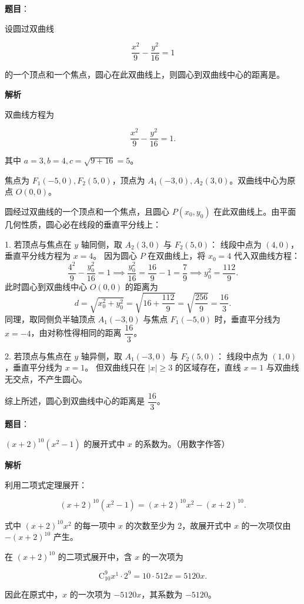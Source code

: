 \begin{answer}

\textbf{题目}：

设圆过双曲线

\nopagebreak[4]
\[
\frac{x^2}{9}-\frac{y^2}{16}=1
\]

的一个顶点和一个焦点，圆心在此双曲线上，则圆心到双曲线中心的距离是\gkblank{}。

\textbf{解析}

双曲线方程为

\nopagebreak[4]
\[
\frac{x^2}{9} - \frac{y^2}{16} = 1.
\]

其中 $a=3, b=4, c=\sqrt{9+16}=5$。

焦点为 $F_1(-5,0), F_2(5,0)$，顶点为 $A_1(-3,0), A_2(3,0)$。双曲线中心为原点 $O(0,0)$。

圆经过双曲线的一个顶点和一个焦点，且圆心 $P(x_0, y_0)$ 在此双曲线上。由平面几何性质，圆心必在线段的垂直平分线上：

1. 若顶点与焦点在 $y$ 轴同侧，取 $A_2(3,0)$ 与 $F_2(5,0)$：
   线段中点为 $(4,0)$，垂直平分线方程为 $x=4$。
   因为圆心 $P$ 在双曲线上，将 $x_0=4$ 代入双曲线方程：
\nopagebreak[4]
\[
\frac{4^2}{9} - \frac{y_0^2}{16} = 1 \implies \frac{y_0^2}{16} = \frac{16}{9} - 1 = \frac79 \implies y_0^2 = \frac{112}{9}.
\]
   此时圆心到双曲线中心 $O(0,0)$ 的距离为
\nopagebreak[4]
\[
d = \sqrt{x_0^2 + y_0^2} = \sqrt{16 + \frac{112}{9}} = \sqrt{\frac{256}{9}} = \frac{16}{3}.
\]
   同理，取同侧负半轴顶点 $A_1(-3,0)$ 与焦点 $F_1(-5,0)$ 时，垂直平分线为 $x=-4$，由对称性得相同的距离 $\dfrac{16}3$。

2. 若顶点与焦点在 $y$ 轴异侧，取 $A_1(-3,0)$ 与 $F_2(5,0)$：
   线段中点为 $(1,0)$，垂直平分线为 $x=1$。
   但双曲线只在 $|x|\ge 3$ 的区域存在，直线 $x=1$ 与双曲线无交点，不产生圆心。

综上所述，圆心到双曲线中心的距离是 $\dfrac{16}{3}$。


\end{answer}
\begin{answer}

\textbf{题目}：

$(x+2)^{10}(x^2-1)$ 的展开式中 $x$ 的系数为\gkblank{}。（用数字作答）

\textbf{解析}

利用二项式定理展开：

\nopagebreak[4]
\[
(x+2)^{10}(x^2-1) = (x+2)^{10}x^2 - (x+2)^{10}.
\]

式中 $(x+2)^{10}x^2$ 的每一项中 $x$ 的次数至少为 2，故展开式中 $x$ 的一次项仅由 $-(x+2)^{10}$ 产生。

在 $(x+2)^{10}$ 的二项式展开中，含 $x$ 的一次项为

\nopagebreak[4]
\[
\mathrm{C}_{10}^9 x^1 \cdot 2^9 = 10 \cdot 512 x = 5120 x.
\]

因此在原式中，$x$ 的一次项为 $-5120 x$，其系数为 $-5120$。


\end{answer}
